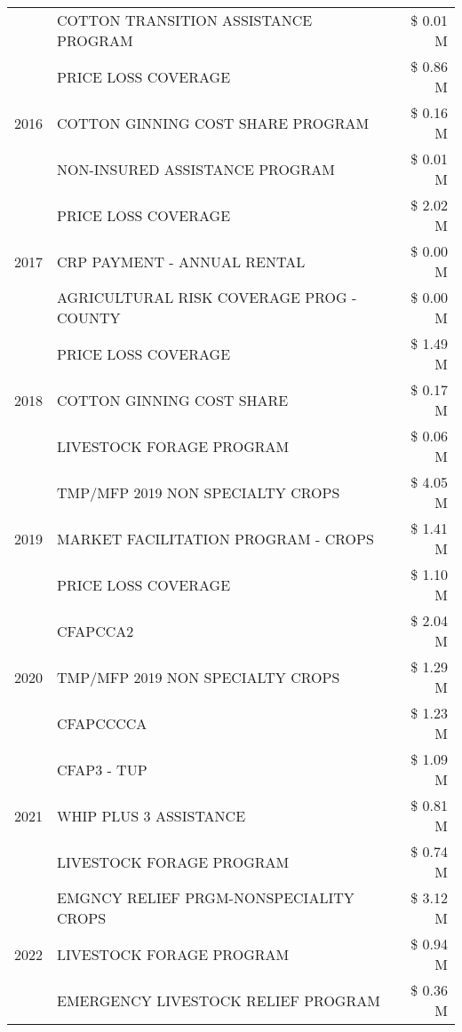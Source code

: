 \begin{tabular}{llr}
 & COTTON TRANSITION ASSISTANCE PROGRAM & \$ 0.01 M \\
\cline{1-3}
\multirow[t]{3}{*}{2016} & PRICE LOSS COVERAGE & \$ 0.86 M \\
 & COTTON GINNING COST SHARE PROGRAM & \$ 0.16 M \\
 & NON-INSURED ASSISTANCE PROGRAM & \$ 0.01 M \\
\cline{1-3}
\multirow[t]{3}{*}{2017} & PRICE LOSS COVERAGE & \$ 2.02 M \\
 & CRP PAYMENT - ANNUAL RENTAL & \$ 0.00 M \\
 & AGRICULTURAL RISK COVERAGE PROG - COUNTY & \$ 0.00 M \\
\cline{1-3}
\multirow[t]{3}{*}{2018} & PRICE LOSS COVERAGE & \$ 1.49 M \\
 & COTTON GINNING COST SHARE & \$ 0.17 M \\
 & LIVESTOCK FORAGE PROGRAM & \$ 0.06 M \\
\cline{1-3}
\multirow[t]{3}{*}{2019} & TMP/MFP 2019 NON SPECIALTY CROPS & \$ 4.05 M \\
 & MARKET FACILITATION PROGRAM - CROPS & \$ 1.41 M \\
 & PRICE LOSS COVERAGE & \$ 1.10 M \\
\cline{1-3}
\multirow[t]{3}{*}{2020} & CFAPCCA2 & \$ 2.04 M \\
 & TMP/MFP 2019 NON SPECIALTY CROPS & \$ 1.29 M \\
 & CFAPCCCCA & \$ 1.23 M \\
\cline{1-3}
\multirow[t]{3}{*}{2021} & CFAP3 - TUP & \$ 1.09 M \\
 & WHIP PLUS 3 ASSISTANCE & \$ 0.81 M \\
 & LIVESTOCK FORAGE PROGRAM & \$ 0.74 M \\
\cline{1-3}
\multirow[t]{3}{*}{2022} & EMGNCY RELIEF PRGM-NONSPECIALITY CROPS & \$ 3.12 M \\
 & LIVESTOCK FORAGE PROGRAM & \$ 0.94 M \\
 & EMERGENCY LIVESTOCK RELIEF PROGRAM & \$ 0.36 M \\
\cline{1-3}
\bottomrule
\end{tabular}
